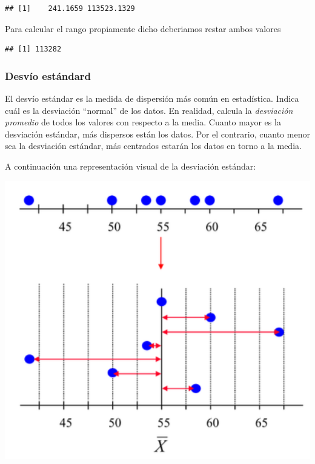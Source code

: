 \documentclass[
]{book}
\newenvironment{Shaded}{\begin{snugshade}}{\end{snugshade}}
\newcommand{\FunctionTok}[1]{\textcolor[rgb]{0.00,0.00,0.00}{#1}}
\newcommand{\NormalTok}[1]{#1}
\newcommand{\SpecialCharTok}[1]{\textcolor[rgb]{0.00,0.00,0.00}{#1}}
\begin{document}
\begin{verbatim}
## [1]    241.1659 113523.1329
\end{verbatim}

Para calcular el rango propiamente dicho deberiamos restar ambos valores

\begin{Shaded}
\end{Shaded}

\begin{verbatim}
## [1] 113282
\end{verbatim}

\hypertarget{desvuxedo-estuxe1ndard}{%
\subsubsection{Desvío estándard}\label{desvuxedo-estuxe1ndard}}

El desvío estándar es la medida de dispersión más común en estadística. Indica cuál es la desviación ``normal'' de los datos. En realidad, calcula la \emph{desviación promedio} de todos los valores con respecto a la media. Cuanto mayor es la desviación estándar, más dispersos están los datos. Por el contrario, cuanto menor sea la desviación estándar, más centrados estarán los datos en torno a la media.

A continuación una representación visual de la desviación estándar:

\includegraphics[width=5.69in]{img/SD}
\end{document}
